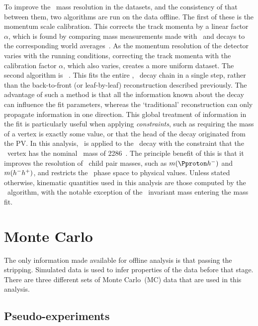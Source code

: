 To improve the \PLambdac\ mass resolution in the datasets, and the consistency 
of that between them, two algorithms are run on the data offline.
The first of these is the momentum scale calibration.
This corrects the track momenta by a linear factor $\alpha$, which is found by 
comparing mass measurements made with \JpsiTomumu\ and 
\decay{\PBplus}{\PJpsi\PKplus} decays to the corresponding world 
averages~\cite{Aaij:2014jba}.
As the momentum resolution of the detector varies with the running conditions, 
correcting the track momenta with the calibration factor $\alpha$, which also 
varies, creates a more uniform dataset.
The second algorithm is \decaytreefitter~\cite{Hulsbergen:2005pu}.
This fits the entire \LbToLcmuX, \LcTophh\ decay chain in a single step, rather 
than the back-to-front (or leaf-by-leaf) reconstruction described previously.
The advantage of such a method is that all the information known about the 
decay can influence the fit parameters, whereas the `traditional' 
reconstruction can only propagate information in one direction.
This global treatment of information in the fit is particularly useful when 
applying \emph{constraints}, such as requiring the mass of a vertex is exactly 
some value, or that the head of the decay originated from the \ac{PV}.
In this analysis, \decaytreefitter\ is applied to the \PLambdab\ decay with the 
constraint that the \phh\ vertex has the nominal \PLambdac\ mass of 
\SI{2286}{\MeVcc}~\cite{PDG2014}.
The principle benefit of this is that it improves the resolution of \PLambdac\ 
child pair masses, such as $m(\phm)$ and $m(h^{-}h^{+})$, and restricts the 
\PLambdac\ phase space to physical values.
Unless stated otherwise, kinematic quantities used in this analysis are those 
computed by the \decaytreefitter\ algorithm, with the notable exception of the 
\phh\ invariant mass entering the mass fit.

\section{Monte Carlo}
\label{chap:cpv:data:mc}

The only information made available for offline analysis is that passing the 
stripping.
Simulated data is used to infer properties of the data before that stage.
There are three different sets of Monte Carlo~(MC) data that are used in this 
analysis.

\subsection{Pseudo-experiments}
\label{chap:cpv:data:mc:toy}

